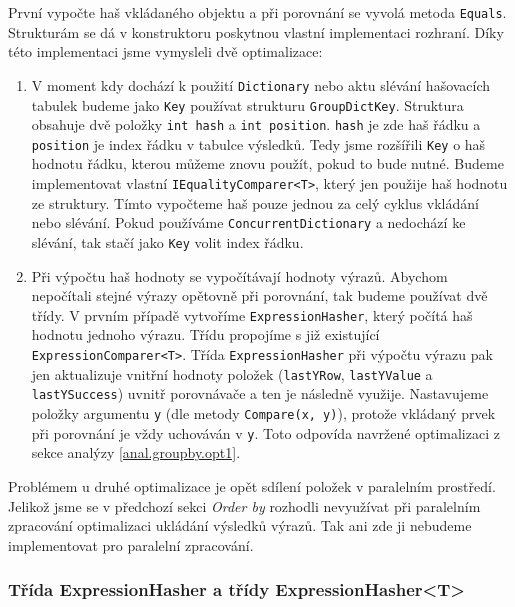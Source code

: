 První vypočte haš vkládaného objektu a při porovnání se vyvolá metoda \texttt{Equals}.
Strukturám se dá v konstruktoru poskytnou vlastní implementaci rozhraní.
Díky této implementaci jsme vymysleli dvě optimalizace:
\begin{enumerate}
\item V moment kdy dochází k použití \texttt{Dictionary} nebo aktu slévání hašovacích tabulek budeme jako \texttt{Key} používat strukturu \texttt{GroupDictKey}.
Struktura obsahuje dvě položky \texttt{int hash} a \texttt{int position}. 
\texttt{hash} je zde haš řádku a \texttt{position} je index řádku v tabulce výsledků.
Tedy jsme rozšířili \texttt{Key} o haš hodnotu řádku, kterou můžeme znovu použít, pokud to bude nutné.
Budeme implementovat vlastní \texttt{IEqualityComparer<T>}, který jen použije haš hodnotu ze struktury.
Tímto vypočteme haš pouze jednou za celý cyklus vkládání nebo slévání.
Pokud používáme \texttt{ConcurrentDictionary} a nedochází ke slévání, tak stačí jako \texttt{Key} volit index řádku.
\item Při výpočtu haš hodnoty se vypočítávají hodnoty výrazů.
Abychom nepočítali stejné výrazy opětovně při porovnání, tak budeme používat dvě třídy.
V prvním případě vytvoříme \texttt{ExpressionHasher}, který počítá haš hodnotu jednoho výrazu.
Třídu propojíme s již existující \texttt{ExpressionComparer<T>}.
Třída \texttt{ExpressionHasher} při výpočtu výrazu pak jen aktualizuje vnitřní hodnoty položek (\texttt{lastYRow}, \texttt{lastYValue} a \texttt{lastYSuccess}) uvnitř porovnávače a ten je následně využije.
Nastavujeme položky argumentu \texttt{y} (dle metody \texttt{Compare(x, y)}), protože vkládaný prvek při porovnání je vždy uchováván v \texttt{y}.
Toto odpovída navržené optimalizaci z sekce analýzy \ref{anal.groupby.opt1}.
\end{enumerate}
Problémem u druhé optimalizace je opět sdílení položek v paralelním prostředí.
Jelikož jsme se v předchozí sekci \textit{Order by} rozhodli nevyužívat při paralelním zpracování optimalizaci ukládání výsledků výrazů.
Tak ani zde ji nebudeme implementovat pro paralelní zpracování. 

\subsubsection{Třída ExpressionHasher a třídy ExpressionHasher<T>}


